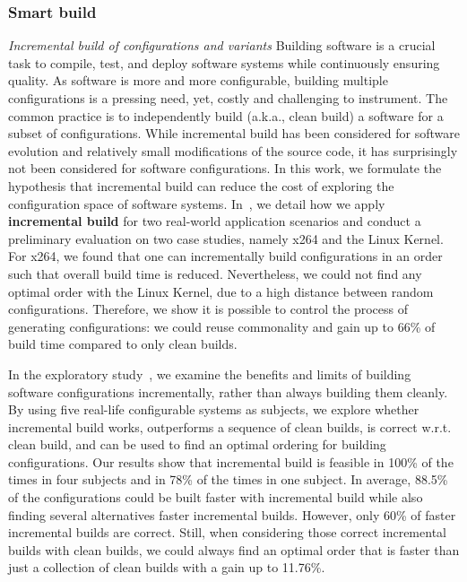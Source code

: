 \subsubsection{Smart build}

\emph{Incremental build of configurations and variants} Building software is a crucial task to compile, test, and deploy software systems while continuously ensuring quality. As software is more and more configurable, building multiple configurations is a pressing need, yet, costly and challenging to instrument. The common practice is to independently build (a.k.a., clean build) a software for a subset of configurations. While incremental build has been considered for software evolution and relatively small modifications of the source code, it has surprisingly not been considered for software configurations. In this work, we formulate the hypothesis that incremental build can reduce the cost of exploring the configuration space of software systems. In~\cite{randrianaina:hal-03558479}, we detail how we apply \textbf{incremental build} for two real-world application scenarios and conduct a preliminary evaluation on two case studies, namely x264 and the Linux Kernel. For x264, we found that one can incrementally build configurations in an order such that overall build time is reduced. Nevertheless, we could not find any optimal order with the Linux Kernel, due to a high distance between random configurations. Therefore, we show it is possible to control the process of generating configurations: we could reuse commonality and gain up to 66\% of build time compared to only clean builds.

 In the exploratory study~\cite{randrianaina:hal-03547219}, we examine the benefits and limits of building software configurations incrementally, rather than always building them cleanly. By using five real-life configurable systems as subjects, we explore whether incremental build works, outperforms a sequence of clean builds, is correct w.r.t. clean build, and can be used to find an optimal ordering for building configurations. Our results show that incremental build is feasible in 100\% of the times in four subjects and in 78\% of the times in one subject. In average, 88.5\% of the configurations could be built faster with incremental build while also finding several alternatives faster incremental builds. However, only 60\% of faster incremental builds are correct. Still, when considering those correct incremental builds with clean builds, we could always find an optimal order that is faster than just a collection of clean builds with a gain up to 11.76\%. 

